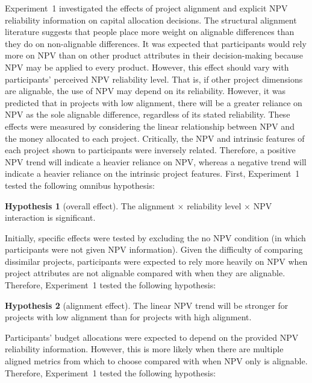\documentclass[
  english,
  man, donotrepeattitle,floatsintext]{apa7}
\theoremstyle{definition}
\theoremstyle{definition}
\theoremstyle{definition}
\theoremstyle{definition}
\newtheorem{hypothesis}{Hypothesis}
\theoremstyle{remark}
\begin{document}
Experiment~1 investigated the effects of project alignment and explicit NPV
reliability information on capital allocation decisions. The structural
alignment literature suggests that people place more weight on alignable
differences than they do on non-alignable differences. It was expected that
participants would rely more on NPV than on other product attributes in their
decision-making because NPV may be applied to every product. However, this
effect should vary with participants' perceived NPV reliability level. That is,
if other project dimensions are alignable, the use of NPV may depend on its
reliability. However, it was predicted that in projects with low alignment,
there will be a greater reliance on NPV as the sole alignable difference,
regardless of its stated reliability. These effects were measured by considering
the linear relationship between NPV and the money allocated to each project.
Critically, the NPV and intrinsic features of each project shown to participants
were inversely related. Therefore, a positive NPV trend will indicate a heavier
reliance on NPV, whereas a negative trend will indicate a heavier reliance on
the intrinsic project features. First, Experiment~1 tested the following omnibus
hypothesis:

\begin{hypothesis}[overall effect]
\protect\hypertarget{hyp:three-way-alignment-2}{}{\label{hyp:three-way-alignment-2} \iffalse (overall effect) \fi{} }The alignment \(\times\) reliability level \(\times\) NPV interaction is
significant.
\end{hypothesis}

Initially, specific effects were tested by excluding the no NPV condition (in
which participants were not given NPV information). Given the difficulty of
comparing dissimilar projects, participants were expected to rely more heavily
on NPV when project attributes are not alignable compared with when they are
alignable. Therefore, Experiment~1 tested the following hypothesis:

\begin{hypothesis}[alignment effect]
\protect\hypertarget{hyp:allocation-alignment-alignment-2}{}{\label{hyp:allocation-alignment-alignment-2} \iffalse (alignment effect) \fi{} }The linear NPV trend will be stronger for projects with low alignment than for
projects with high alignment.
\end{hypothesis}

Participants' budget allocations were expected to depend on the provided NPV
reliability information. However, this is more likely when there are multiple
aligned metrics from which to choose compared with when NPV only is alignable.
Therefore, Experiment~1 tested the following hypothesis:
\end{document}
